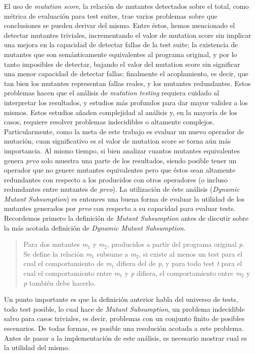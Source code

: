 El uso de \emph{mutation score}, la relaci\'on de mutantes detectados sobre el total, como m\'etrica de evaluaci\'on para test suites, trae varios problemas sobre que conclusiones se pueden derivar del mismo. Entre \'estos, hemos mencionado el detectar mutantes triviales, incrementando el valor de mutation score sin implicar una mejora en la capacidad de detectar fallas de la test suite; la existencia de mutantes que son sem\'anticamente equivalentes al programa original, y por lo tanto imposibles de detectar, bajando el valor del mutation score sin significar una menor capacidad de detectar fallas; finalmente el acoplamiento, es decir, que tan bien los mutantes representan fallas reales, y los mutantes redundantes. Estos problemas hacen que el an\'alisis de \emph{mutation testing} requiera cuidado al interpretar los resultados, y estudios m\'as profundos para dar mayor validez a los mismos. Estos estudios a\~naden complejidad al an\'alisis y, en la mayor\'ia de los casos, requiere resolver problemas indecidibles o altamente complejos. Particularmente, como la meta de este trabajo es evaluar un nuevo operador de mutaci\'on, cuan significativo es el valor de mutation score se torna a\'un m\'as importancia. Al mismo tiempo, si bien analizar cuantos mutantes equivalentes genera \emph{prvo} solo muestra una parte de los resultados, siendo posible tener un operador que no genere mutantes equivalentes pero que \'estos sean altamente redundantes con respecto a los producidos con otros operadores (o incluso redundantes entre mutantes de \emph{prvo}). La utilizaci\'on de \'este an\'alisis (\emph{Dynamic Mutant Subsumption}) es entonces una buena forma de evaluar la utilidad de los mutantes generados por \emph{prvo} con respecto a su capacidad para evaluar tests.
Recordemos primero la definici\'on de \emph{Mutant Subsumption} antes de discutir sobre la m\'as acotada definici\'on de \emph{Dynamic Mutant Subsumption}.
\begin{quote}
	Para dos mutantes \emph{m$_1$} y \emph{m$_2$}, producidos a partir del programa original \emph{p}. Se define la relaci\'on \emph{m$_1$} subsume a \emph{m$_2$}, si existe al menos un test para el cual el comportamiento de \emph{m$_1$} difiera del de \emph{p}, y para todo test \emph{t} para el cual el comportamiento entre \emph{m$_1$} y \emph{p} difiera, el comportamiento entre \emph{m$_2$} y \emph{p} tambi\'en debe hacerlo.
\end{quote}
Un punto importante es que la definici\'on anterior habla del universo de tests, todo test posible, lo cual hace de \emph{Mutant Subsumption}, un problema indecidible salvo para casos triviales, es decir, problemas con un conjunto finito de posibles escenarios. De todas formas, es posible una resoluci\'on acotada a este problema. Antes de pasar a la implementaci\'on de este an\'alisis, es necesario mostrar cual es la utilidad del mismo.
